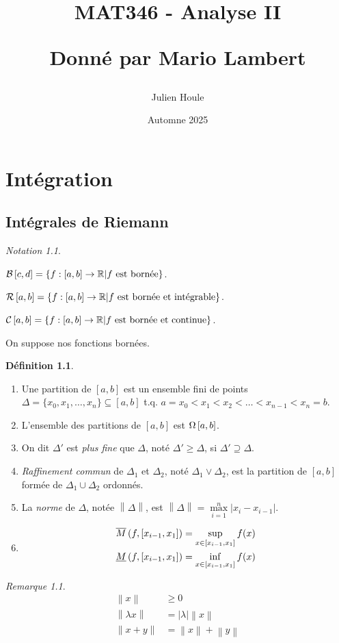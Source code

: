 \documentclass{report}
\title{MAT346 - Analyse II

Donn\'e par Mario Lambert}
\author{Julien Houle}
\date{Automne 2025}
\newcommand*{\raffinement}[2]{#1 \vee #2}
\newcommand*{\norme}[1]{\left\| #1 \right\|}
\newcommand*{\abs}[1]{\left| #1 \right|}
\newcommand*{\gte}{\geqslant}
\newcommand*{\reels}{\mathbb{R}}
\theoremstyle{definition}
\newtheorem*{defin}{D\'efinition}
\theoremstyle{remark}
\newtheorem*{nota}{Notation}
\newtheorem*{rema}{Remarque}
\begin{document}
	\maketitle
	\tableofcontents
	\newpage

	\chapter{Int\'egration}
	\section{Int\'egrales de Riemann}

	\begin{nota}
		~

		$\bornee[c,d]=\left\lbrace f:[a,b] \to \reels \middle| f \text{ est born\'ee} \right\rbrace$.

		$\riemann=\left\lbrace f:[a,b] \to \reels \middle| f \text{ est born\'ee et int\'egrable} \right\rbrace$.

		$\continue=\left\lbrace f:[a,b] \to \reels \middle| f \text{ est born\'ee et continue} \right\rbrace$.
	\end{nota}

	On suppose nos fonctions born\'ees.

	\begin{defin}
		~

		\begin{enumerate}[label=\alph*)]
			\item Une partition de $[a,b]$ est un ensemble fini de points $\Delta=\{x_0,x_1,\dotsc,x_n\} \subseteq [a,b]$ t.q. $a=x_0 < x_1 < x_2 < \dotsc < x_{n-1} < x_n=b$.
			\item L'ensemble des partitions de $[a,b]$ est $\partitions$.
			\item On dit $\Delta'$ est \emph{plus fine} que $\Delta$, not\'e $\Delta' \gte \Delta$, si $\Delta' \supseteq \Delta$.
			\item \emph{Raffinement commun} de $\Delta_1$ et $\Delta_2$, not\'e $\raffinement{\Delta_1}{\Delta_2}$, est la partition de $[a,b]$ form\'ee de $\Delta_1 \cup \Delta_2$ ordonn\'es.
			\item La \emph{norme} de $\Delta$, not\'ee $\norme{\Delta}$, est $\norme{\Delta}=\max\limits_{i=1}^{n}\abs{x_i-x_{i-1}}$.
			\item
			\begin{align*}
				\msup{f}[x_{i-1},x_1]&= \sup\limits_{x \in \left[ x_{i-1},x_1 \right]}f(x)\\
				\minf{f}[x_{i-1},x_1]&= \inf\limits_{x \in \left[ x_{i-1},x_1 \right]}f(x)
			\end{align*}
		\end{enumerate}
		\begin{rema}
			\begin{align*}
				\norme{x}&\gte0\\
				\norme{\lambda x}&=\abs{\lambda} \norme{x}\\
				\norme{x+y}&= \norme{x} + \norme{y}
			\end{align*}
		\end{rema}
	\end{defin}
\end{document}
